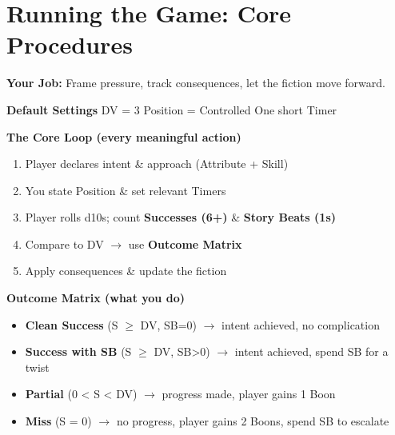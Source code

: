 \chapter{Running the Game: Core Procedures}
\label{ch:gm-core}

\begin{tcolorbox}[
  title={\textbf{Running Fate's Edge --- Core Procedures in Brief}},
  colback=blue!5!white,
  colframe=blue!75!black,
  boxrule=0.8pt,
  arc=3mm,
  fonttitle=\bfseries\large,
  left=8pt,
  right=8pt,
  top=8pt,
  bottom=8pt,
  sharp corners=southwest,
  enhanced,
  breakable
]

\small
\setlength{\parskip}{0.6\baselineskip}
\setlength{\parindent}{0pt}

\textbf{Your Job:} Frame pressure, track consequences, let the fiction move forward.

\medskip
\textbf{Default Settings} \quad DV = 3 \quad \textperiodcentered \quad Position = Controlled \quad \textperiodcentered \quad One short Timer 

\medskip
\textbf{The Core Loop (every meaningful action)}
\begin{enumerate}[leftmargin=*, nosep]
  \item Player declares intent \& approach (Attribute + Skill)
  \item You state Position \& set relevant Timers
  \item Player rolls d10s; count \textbf{Successes (6+)} \& \textbf{Story Beats (1s)}
  \item Compare to DV $\rightarrow$ use \textbf{Outcome Matrix}
  \item Apply consequences \& update the fiction
\end{enumerate}

\medskip
\textbf{Outcome Matrix (what you do)}
\begin{itemize}[leftmargin=*, nosep]
  \item \textbf{Clean Success} (S $\geq$ DV, SB=0) $\rightarrow$ intent achieved, no complication
  \item \textbf{Success with SB} (S $\geq$ DV, SB>0) $\rightarrow$ intent achieved, spend SB for a twist
  \item \textbf{Partial} (0 < S < DV) $\rightarrow$ progress made, player gains 1 Boon
  \item \textbf{Miss} (S = 0) $\rightarrow$ no progress, player gains 2 Boons, spend SB to escalate
\end{itemize}


\end{tcolorbox}
